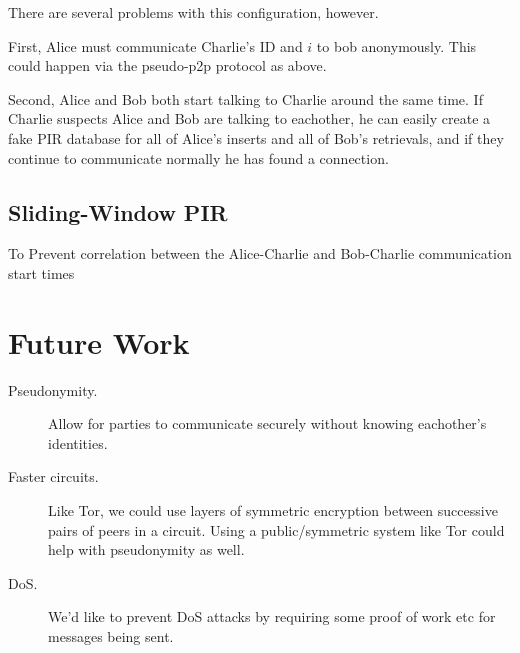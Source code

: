 \documentclass{paper}
\begin{document}
There are several problems with this configuration, however.

First, Alice must communicate Charlie's ID and $i$ to bob anonymously. This could happen via the pseudo-p2p protocol as above. 

Second, Alice and Bob both start talking to Charlie around the same time. If Charlie suspects Alice and Bob are talking to eachother, he can easily create a fake PIR database for all of Alice's inserts and all of Bob's retrievals, and if they continue to communicate normally he has found a connection. 

\subsection{Sliding-Window PIR}
To Prevent correlation between the Alice-Charlie and Bob-Charlie communication start times 


\section{Future Work}
\begin{description}
  \item[Pseudonymity.] Allow for parties to communicate securely without knowing eachother's identities.
  \item[Faster circuits.] Like Tor, we could use layers of symmetric encryption between successive pairs of peers in a circuit. Using a public/symmetric system like Tor could help with pseudonymity as well.
  \item[DoS.] We'd like to prevent DoS attacks by requiring some proof of work etc for messages being sent.
\end{description}

\newpage



\end{document}
